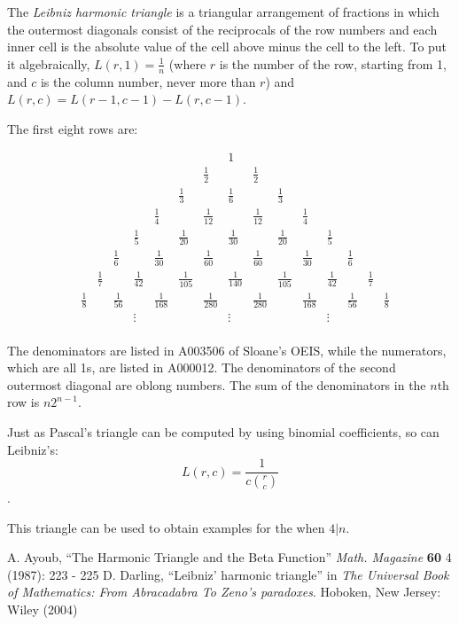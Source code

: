 \documentclass[12pt]{article}
\begin{document}
The {\em Leibniz harmonic triangle} is a triangular arrangement of fractions in which the outermost diagonals consist of the reciprocals of the row numbers and each inner cell is the absolute value of the cell above minus the cell to the left. To put it algebraically, $L(r, 1) = \frac{1}{n}$ (where $r$ is the number of the row, starting from 1, and $c$ is the column number, never more than $r$) and $L(r, c) = L(r - 1, c - 1) - L(r, c - 1)$.

The first eight rows are:

$$\begin{array}{cccccccccccccccccc}
& & & & & & & & & 1 & & & & & & & &\\
& & & & & & & & \frac{1}{2} & & \frac{1}{2} & & & & & & &\\
& & & & & & & \frac{1}{3} & & \frac{1}{6} & & \frac{1}{3} & & & & & &\\
& & & & & & \frac{1}{4} & & \frac{1}{12} & & \frac{1}{12} & & \frac{1}{4} & & & & &\\
& & & & & \frac{1}{5} & & \frac{1}{20} & & \frac{1}{30} & & \frac{1}{20} & & \frac{1}{5} & & & &\\
& & & & \frac{1}{6} & & \frac{1}{30} & & \frac{1}{60} & & \frac{1}{60} & & \frac{1}{30} & & \frac{1}{6} & & &\\
& & & \frac{1}{7} & & \frac{1}{42} & & \frac{1}{105} & & \frac{1}{140} & & \frac{1}{105} & & \frac{1}{42} & & \frac{1}{7} & &\\
& & \frac{1}{8} & & \frac{1}{56} & & \frac{1}{168} & & \frac{1}{280} & & \frac{1}{280} & & \frac{1}{168} & & \frac{1}{56} & & \frac{1}{8} &\\
& & & & &\vdots & & & & \vdots & & & & \vdots& & & & \\
\end{array}$$

The denominators are listed in A003506 of Sloane's OEIS, while the numerators, which are all 1s, are listed in A000012. The denominators of the second outermost diagonal are oblong numbers. The sum of the denominators in the $n$th row is $n2^{n - 1}$.

Just as Pascal's triangle can be computed by using binomial coefficients, so can Leibniz's: $$L(r, c) = \frac{1}{c {r \choose c}}$$.

This triangle can be used to obtain examples for the  when $4|n$.

\begin{thebibliography}{2}
 A. Ayoub, ``The Harmonic Triangle and the Beta Function'' {\it Math. Magazine} {\bf 60} 4 (1987): 223 - 225
 D. Darling, ``Leibniz' harmonic triangle'' in {\it The Universal Book of Mathematics: From Abracadabra To Zeno's paradoxes}. Hoboken, New Jersey: Wiley (2004) 
\end{thebibliography}
\end{document}

